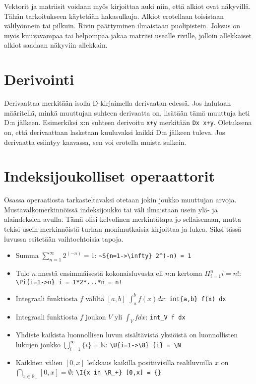 Vektorit ja matriisit voidaan myös kirjoittaa auki niin, että alkiot ovat näkyvillä. Tähän tarkoitukseen käytetään hakasulkuja. Alkiot erotellaan toisistaan 
välilyönnein tai pilkuin. Rivin päättyminen ilmaistaan puolipistein. Joksus on myös kuuvavampaa tai helpompaa jakaa matriisi usealle riville, jolloin allekkaiset 
alkiot saadaan näkyviin allekkain.

\section{Derivointi}
Derivaattaa merkitään isolla D-kirjaimella derivaatan edessä. 
Jos halutaan määritellä, minkä muuttujan suhteen derivaatta on, lisätään tämä muuttuja heti D:n jälkeen.
Esimerkiksi x:n suhteen derivoitu \verb$x+y$ merkitään \verb$Dx x+y$.
Oletuksena on, että derivaattaan lasketaan kuuluvaksi kaikki D:n jälkeen tuleva. Jos derivaatta esiintyy kaavassa, sen voi erotella muista sulkein.

\section{Indeksijoukolliset operaattorit} \label{sec:indexsets}
Osassa operaatiosta tarkasteltavaksi otetaan jokin joukko muuttujan arvoja.
Mustavalkomerkinnöissä indeksijoukko tai väli ilmaistaan usein ylä- ja alaindeksien avulla.
Tämä olisi kelvolinen merkintätapa jo sellaisenaan, mutta tekisi usein merkinnöistä turhan monimutkaisia kirjoittaa ja lukea.
Siksi tässä luvussa esitetään vaihtoehtoisia tapoja.

\begin{itemize}
	\item Summa $\sum_{n=1}^\infty 2^(-n) = 1$: \verb$~S{n=1->\infty} 2^(-n) = 1$
	\item Tulo $n$:nnestä ensimmäisestä kokonaisluvusta eli $n$:n kertoma $\Pi_{i=1}^n i = n!$: \verb$\Pi{i=1->n} i = 1*2*...*n = n!$
	\item Integraali funktiosta $f$ väliltä $[a,b]$ $\int_a^b f(x) dx$: \verb$int{a,b} f(x) dx$
	\item Integraali funktiosta $f$ joukon $V$ yli $\int_V f dx$: \verb$int_V f dx$
	\item Yhdiste kaikista luonnollisen luvun sisältävistä yksiöistä on luonnollisten lukujen joukko $\bigcup_{i=1}^\infty \{i\} = \mathbb{N}$: 
	\verb$\U{i=1->\8} {i} = \N$
	\item Kaikkien välien $[0,x]$ leikkaus kaikilla positiivisilla realiluvuilla $x$ on $\bigcap_{x\in \mathbb{R}_+} [0,x] = \emptyset$:
	\verb$\I{x in \R_+} [0,x] = {}$
\end{itemize}

